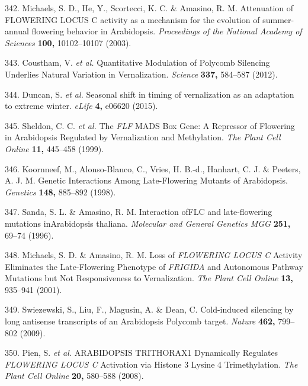 \documentclass[12pt,]{book}
\begin{document}
\hypertarget{ref-michaels_attenuation_2003}{}
342. Michaels, S. D., He, Y., Scortecci, K. C. \& Amasino, R. M.
Attenuation of FLOWERING LOCUS C activity as a mechanism for the
evolution of summer-annual flowering behavior in Arabidopsis.
\emph{Proceedings of the National Academy of Sciences} \textbf{100,}
10102--10107 (2003).

\hypertarget{ref-coustham_quantitative_2012}{}
343. Coustham, V. \emph{et al.} Quantitative Modulation of Polycomb
Silencing Underlies Natural Variation in Vernalization. \emph{Science}
\textbf{337,} 584--587 (2012).

\hypertarget{ref-duncan_seasonal_2015}{}
344. Duncan, S. \emph{et al.} Seasonal shift in timing of vernalization
as an adaptation to extreme winter. \emph{eLife} \textbf{4,} e06620
(2015).

\hypertarget{ref-sheldon_flf_1999}{}
345. Sheldon, C. C. \emph{et al.} The \emph{FLF} MADS Box Gene: A
Repressor of Flowering in Arabidopsis Regulated by Vernalization and
Methylation. \emph{The Plant Cell Online} \textbf{11,} 445--458 (1999).

\hypertarget{ref-koornneef_genetic_1998}{}
346. Koornneef, M., Alonso-Blanco, C., Vries, H. B.-d., Hanhart, C. J.
\& Peeters, A. J. M. Genetic Interactions Among Late-Flowering Mutants
of Arabidopsis. \emph{Genetics} \textbf{148,} 885--892 (1998).

\hypertarget{ref-sanda_interaction_1996}{}
347. Sanda, S. L. \& Amasino, R. M. Interaction ofFLC and late-flowering
mutations inArabidopsis thaliana. \emph{Molecular and General Genetics
MGG} \textbf{251,} 69--74 (1996).

\hypertarget{ref-michaels_loss_2001}{}
348. Michaels, S. D. \& Amasino, R. M. Loss of \emph{FLOWERING LOCUS C}
Activity Eliminates the Late-Flowering Phenotype of \emph{FRIGIDA} and
Autonomous Pathway Mutations but Not Responsiveness to Vernalization.
\emph{The Plant Cell Online} \textbf{13,} 935--941 (2001).

\hypertarget{ref-swiezewski_cold_induced_2009}{}
349. Swiezewski, S., Liu, F., Magusin, A. \& Dean, C. Cold-induced
silencing by long antisense transcripts of an Arabidopsis Polycomb
target. \emph{Nature} \textbf{462,} 799--802 (2009).

\hypertarget{ref-pien_arabidopsis_2008}{}
350. Pien, S. \emph{et al.} ARABIDOPSIS TRITHORAX1 Dynamically Regulates
\emph{FLOWERING LOCUS C} Activation via Histone 3 Lysine 4
Trimethylation. \emph{The Plant Cell Online} \textbf{20,} 580--588
(2008).
\end{document}
